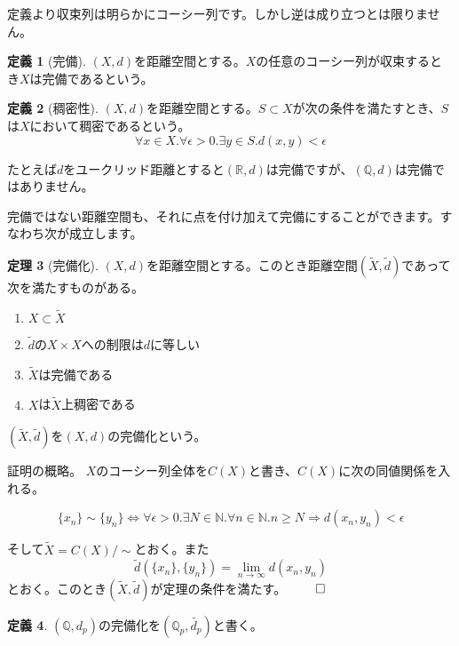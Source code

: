\documentclass[uplatex]{jsarticle}
\newcommand{\Q}{\mathbb{Q}}
\newcommand{\R}{\mathbb{R}}
\theoremstyle{definition} %
\newtheorem{thm}{定理}
\newtheorem{defi}[thm]{定義}
\begin{document}
定義より収束列は明らかにコーシー列です。しかし逆は成り立つとは限りません。

\begin{oframed}\begin{defi}[完備]
$(X, d)$を距離空間とする。$X$の任意のコーシー列が収束するとき$X$は完備であるという。
\end{defi}\end{oframed}


\begin{oframed}\begin{defi}[稠密性]
$(X, d)$を距離空間とする。$S \subset X$が次の条件を満たすとき、$S$は$X$において稠密であるという。
\[
\forall x \in X. \forall \epsilon > 0. \exists y \in S. d(x, y) < \epsilon
\]
\end{defi}\end{oframed}

たとえば$d$をユークリッド距離とすると$(\R, d)$は完備ですが、$(\Q, d)$は完備ではありません。

完備ではない距離空間も、それに点を付け加えて完備にすることができます。すなわち次が成立します。

\begin{oframed}\begin{thm}[完備化]
$(X, d)$を距離空間とする。このとき距離空間$(\tilde{X}, \tilde{d})$であって次を満たすものがある。
\begin{enumerate}
\item $X \subset \tilde{X}$
\item $\tilde{d}$の$X \times X$への制限は$d$に等しい
\item $\tilde{X}$は完備である
\item $X$は$\tilde{X}$上稠密である
\end{enumerate}
$(\tilde{X}, \tilde{d})$を$(X,d)$の完備化という。
\end{thm}\end{oframed}
\noindent 証明の概略。
$X$のコーシー列全体を$C(X)$と書き、$C(X)$に次の同値関係を入れる。

\[\{x_n\} \sim \{y_n\} \iff \forall \epsilon > 0. \exists N \in \mathbb{N}. \forall n \in \mathbb{N}. n \geq N \Rightarrow d(x_n, y_n) < \epsilon\]

そして$\tilde{X} = C(X)/\sim$とおく。また
\[\tilde{d}(\{x_n\}, \{y_n\}) = \lim_{n\to\infty} d(x_n, y_n)\]
とおく。このとき$(\tilde{X}, \tilde{d})$が定理の条件を満たす。 $\qed$

\begin{oframed}\begin{defi}
$(\Q, d_p)$の完備化を$(\Q_p, \tilde{d_p})$と書く。
\end{defi}\end{oframed}
\end{document}
